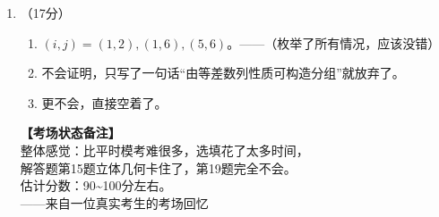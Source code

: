 \documentclass[12pt,a4paper]{article}
\begin{document}
\begin{enumerate}[label=\arabic*.]
\begin{enumerate}[label=(\arabic*)]
\item 中心对称图形？$f(x)+f(2-x)=2a$，所以关于$(1,a)$中心对称。（这题意外的简单）

\item 不会做，只写了$b$的范围大概是$\left[-\dfrac{2}{3},+\infty\right)$，过程没来得及写完。
\end{enumerate}

\item （17分）
\begin{enumerate}[label=(\arabic*)]
\item $(i,j)=(1,2),(1,6),(5,6)$。——（枚举了所有情况，应该没错）

\item 不会证明，只写了一句话“由等差数列性质可构造分组”就放弃了。

\item 更不会，直接空着了。
\end{enumerate}

\vspace{1cm}

\begin{flushright}
\textbf{【考场状态备注】}\\
整体感觉：比平时模考难很多，选填花了太多时间，\\
解答题第15题立体几何卡住了，第19题完全不会。\\
估计分数：90\~{}100分左右。\\
——来自一位真实考生的考场回忆
\end{flushright}

\end{enumerate}
\end{document}

